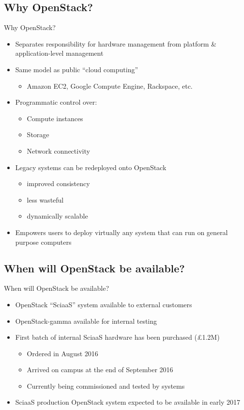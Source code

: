\documentclass[xcolor=x11names,compress]{beamer}
\renewcommand{\(}{\begin{columns}}
\renewcommand{\)}{\end{columns}}
\newcommand{\<}[1]{\begin{column}{#1}}
\renewcommand{\>}{\end{column}}
\begin{document}
\subsection*{Why OpenStack?}
\begin{frame}{Why OpenStack?}
\cloudsbackground
\begin{itemize}
\item Separates responsibility for hardware management from platform \& application-level management
\item Same model as public ``cloud computing''
		\begin{itemize}
		\item Amazon EC2, Google Compute Engine, Rackspace, etc.
		\end{itemize}
\item Programmatic control over:
		\begin{itemize}
		\item Compute instances
		\item Storage
		\item Network connectivity
		\end{itemize}
\item Legacy systems can be redeployed onto OpenStack
	\begin{itemize}
	\item improved consistency
	\item less wasteful
	\item dynamically scalable
	\end{itemize}
\item Empowers users to deploy virtually any system that can run on general purpose computers
\end{itemize}
\end{frame}

\subsection*{When will OpenStack be available?}
\begin{frame}{When will OpenStack be available?}
\cloudsbackground
\begin{itemize}
\item OpenStack ``SciaaS'' system available to external customers
\item OpenStack-gamma available for internal testing
\item First batch of internal SciaaS hardware has been purchased (\pounds 1.2M)
	\begin{itemize}
	\item Ordered in August 2016
	\item Arrived on campus at the end of September 2016
	\item Currently being commissioned and tested by systems
	\end{itemize}
\item SciaaS production OpenStack system expected to be available in early 2017
\end{itemize}
\end{frame}
\end{document}
